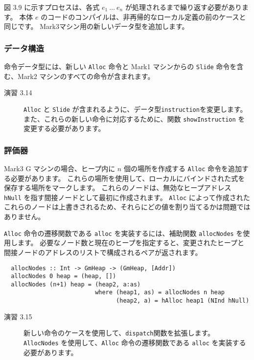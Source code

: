 \documentclass{jarticle}
\begin{document}
図 3.9 に示すプロセスは、各式 $e_1 ~ \ldots ~ e_n$ が処理されるまで繰り返す必要があります。
本体 $e$ のコードのコンパイルは、非再帰的なローカル定義の前のケースと同じです。
Mark3マシン用の新しいデータ型を追加します。

\subsubsection{データ構造}

命令データ型には、新しい \texttt{Alloc} 命令と Mark1 マシンからの \texttt{Slide} 命令を含む、Mark2 マシンのすべての命令が含まれます。

\begin{description}
	\item[演習 3.14] \texttt{Alloc} と \texttt{Slide} が含まれるように、データ型\texttt{instruction}を変更します。
		また、これらの新しい命令に対応するために、関数 \texttt{showInstruction} を変更する必要があります。
\end{description}

\subsubsection{評価器}

Mark3 G マシンの場合、ヒープ内に $n$ 個の場所を作成する \texttt{Alloc} 命令を追加する必要があります。
これらの場所を使用して、ローカルにバインドされた式を保存する場所をマークします。
これらのノードは、無効なヒープアドレス \texttt{hNull} を指す間接ノードとして最初に作成されます。
\texttt{Alloc} によって作成されたこれらのノードは上書きされるため、それらにどの値を割り当てるかは問題ではありません。

\texttt{Alloc} 命令の遷移関数である \texttt{alloc} を実装するには、補助関数 \texttt{allocNodes} を使用します。
必要なノード数と現在のヒープを指定すると、変更されたヒープと間接ノードのアドレスのリストで構成されるペアが返されます。

\begin{verbatim}
  allocNodes :: Int -> GmHeap -> (GmHeap, [Addr])
  allocNodes 0 heap = (heap, [])
  allocNodes (n+1) heap = (heap2, a:as)
                          where (heap1, as) = allocNodes n heap
                                (heap2, a) = hAlloc heap1 (NInd hNull)
\end{verbatim}

\begin{description}
	\item[演習 3.15] 新しい命令のケースを使用して、\texttt{dispatch}関数を拡張します。
		\texttt{AllocNodes} を使用して、\texttt{Alloc} 命令の遷移関数である \texttt{alloc} を実装する必要があります。
\end{description}
\end{document}
